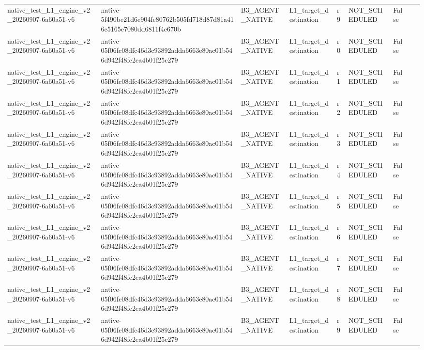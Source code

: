 \begin{tabular}{lllllllll}
native\_test\_L1\_engine\_v2\_20260907-6a60a51-v6 & native-5f490be21d6e904fe80762b505fd718d87d81a416c5165e7080dd6811f4e670b & B3\_AGENT\_NATIVE & L1\_target\_destination & r9 & NOT\_SCHEDULED & False &  &  \\
native\_test\_L1\_engine\_v2\_20260907-6a60a51-v6 & native-05f06fc08dfc46d3c93892adda6663e80ac01b546d942f48fe2ea4b01f25c279 & B3\_AGENT\_NATIVE & L1\_target\_destination & r0 & NOT\_SCHEDULED & False &  &  \\
native\_test\_L1\_engine\_v2\_20260907-6a60a51-v6 & native-05f06fc08dfc46d3c93892adda6663e80ac01b546d942f48fe2ea4b01f25c279 & B3\_AGENT\_NATIVE & L1\_target\_destination & r1 & NOT\_SCHEDULED & False &  &  \\
native\_test\_L1\_engine\_v2\_20260907-6a60a51-v6 & native-05f06fc08dfc46d3c93892adda6663e80ac01b546d942f48fe2ea4b01f25c279 & B3\_AGENT\_NATIVE & L1\_target\_destination & r2 & NOT\_SCHEDULED & False &  &  \\
native\_test\_L1\_engine\_v2\_20260907-6a60a51-v6 & native-05f06fc08dfc46d3c93892adda6663e80ac01b546d942f48fe2ea4b01f25c279 & B3\_AGENT\_NATIVE & L1\_target\_destination & r3 & NOT\_SCHEDULED & False &  &  \\
native\_test\_L1\_engine\_v2\_20260907-6a60a51-v6 & native-05f06fc08dfc46d3c93892adda6663e80ac01b546d942f48fe2ea4b01f25c279 & B3\_AGENT\_NATIVE & L1\_target\_destination & r4 & NOT\_SCHEDULED & False &  &  \\
native\_test\_L1\_engine\_v2\_20260907-6a60a51-v6 & native-05f06fc08dfc46d3c93892adda6663e80ac01b546d942f48fe2ea4b01f25c279 & B3\_AGENT\_NATIVE & L1\_target\_destination & r5 & NOT\_SCHEDULED & False &  &  \\
native\_test\_L1\_engine\_v2\_20260907-6a60a51-v6 & native-05f06fc08dfc46d3c93892adda6663e80ac01b546d942f48fe2ea4b01f25c279 & B3\_AGENT\_NATIVE & L1\_target\_destination & r6 & NOT\_SCHEDULED & False &  &  \\
native\_test\_L1\_engine\_v2\_20260907-6a60a51-v6 & native-05f06fc08dfc46d3c93892adda6663e80ac01b546d942f48fe2ea4b01f25c279 & B3\_AGENT\_NATIVE & L1\_target\_destination & r7 & NOT\_SCHEDULED & False &  &  \\
native\_test\_L1\_engine\_v2\_20260907-6a60a51-v6 & native-05f06fc08dfc46d3c93892adda6663e80ac01b546d942f48fe2ea4b01f25c279 & B3\_AGENT\_NATIVE & L1\_target\_destination & r8 & NOT\_SCHEDULED & False &  &  \\
native\_test\_L1\_engine\_v2\_20260907-6a60a51-v6 & native-05f06fc08dfc46d3c93892adda6663e80ac01b546d942f48fe2ea4b01f25c279 & B3\_AGENT\_NATIVE & L1\_target\_destination & r9 & NOT\_SCHEDULED & False &  &  \\

\end{tabular}
